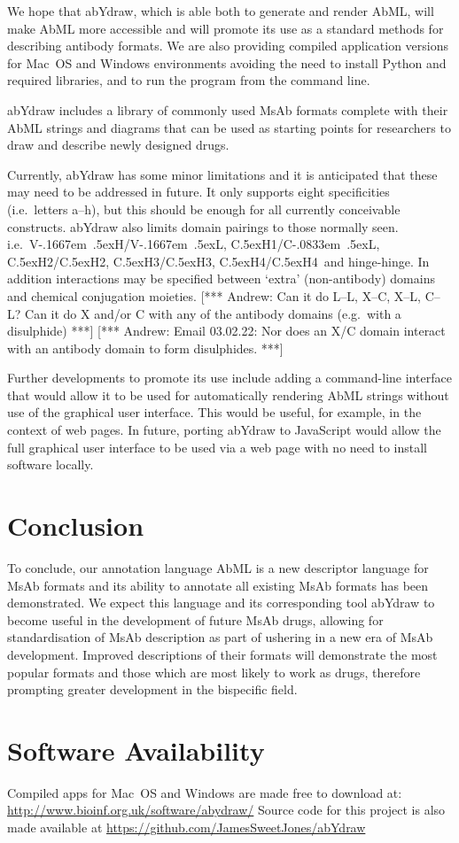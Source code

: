 \documentclass[a4paper]{article}
\newcommand{\VH}{\mbox{V\kern-.1667em \lower.5ex\hbox{\scriptsize H}}}
\newcommand{\VL}{\mbox{V\kern-.1667em \lower.5ex\hbox{\scriptsize L}}}
\newcommand{\VHVL}{\mbox{\VH/\VL}}
\newcommand{\CH}[1]{\mbox{C\lower.5ex\hbox{\scriptsize H}#1}}
\newcommand{\CL}{\mbox{C\kern-.0833em \lower.5ex\hbox{\scriptsize L}}}
\newcommand{\andrew}[1]{{\color{red} [*** Andrew: #1 ***]}}
\begin{document}
We hope that abYdraw, which is able both to generate and render AbML,
will make AbML more accessible and will promote its use as a standard
methods for describing antibody formats.  We are also providing
compiled application versions for Mac~OS and Windows environments
avoiding the need to install Python and required libraries, and to run
the program from the command line.

abYdraw includes a library of commonly used MsAb formats complete with their AbML
strings and diagrams that can be used as starting points for
researchers to draw and describe newly designed drugs.

Currently, abYdraw has some minor limitations and it is anticipated that
these may need to be addressed in future. It only supports eight
specificities (i.e.\ letters a--h), but this should be enough for all
currently conceivable constructs.  abYdraw also
limits domain pairings to those normally seen. i.e.\ \VHVL,
\CH{1}/\CL, \CH{2}/\CH{2}, \CH{3}/\CH{3}, \CH{4}/\CH{4}\ and
hinge-hinge. In addition interactions may be specified between `extra'
(non-antibody) domains and chemical conjugation moieties.  \andrew{Can
  it do L--L, X--C, X--L, C--L? Can it do X and/or C with any of the
  antibody domains (e.g.\ with a disulphide)}
\andrew{Email 03.02.22: Nor does an X/C domain interact with an antibody domain to form disulphides.}

Further developments to promote its use include adding a command-line
interface that would allow it to be used for automatically rendering
AbML strings without use of the graphical user interface. This would
be useful, for example, in the context of web pages. In future,
porting abYdraw to JavaScript would allow the full graphical user
interface to be used via a web page with no need to install software
locally.


\section{Conclusion}

To conclude, our annotation language AbML is a new descriptor language
for MsAb formats and its ability to annotate all existing MsAb formats
has been demonstrated. We expect this language and its corresponding
tool abYdraw to become useful in the development of future MsAb drugs,
allowing for standardisation of MsAb description as part of ushering
in a new era of MsAb development. Improved descriptions of their
formats will demonstrate the most popular formats and those which are
most likely to work as drugs, therefore prompting greater development
in the bispecific field.  

\section{Software Availability}
Compiled apps for Mac~OS and Windows are made free to download at:
\url{http://www.bioinf.org.uk/software/abydraw/}
Source code for this project is also made available at
\url{https://github.com/JamesSweetJones/abYdraw}

 
\end{document}
